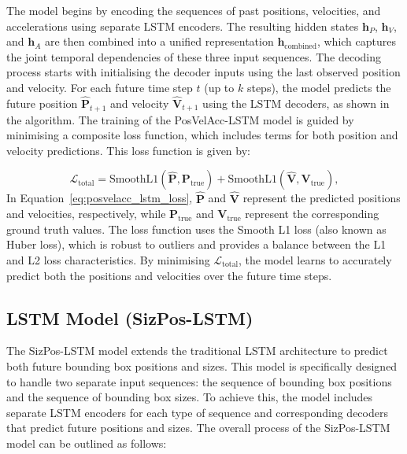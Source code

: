 \documentclass[12pt,oneside]{book} %
\begin{document}
\noindent The model begins by encoding the sequences of past positions, velocities, and accelerations using separate LSTM encoders. The resulting hidden states $\mathbf{h}_P$, $\mathbf{h}_V$, and $\mathbf{h}_A$ are then combined into a unified representation $\mathbf{h}_{\text{combined}}$, which captures the joint temporal dependencies of these three input sequences.
The decoding process starts with initialising the decoder inputs using the last observed position and velocity. For each future time step $t$ (up to $k$ steps), the model predicts the future position $\hat{\mathbf{P}}_{t+1}$ and velocity $\hat{\mathbf{V}}_{t+1}$ using the LSTM decoders, as shown in the algorithm.
The training of the PosVelAcc-LSTM model is guided by minimising a composite loss function, which includes terms for both position and velocity predictions. This loss function is given by:

\begin{equation}
    \mathcal{L}_{\text{total}} = \text{SmoothL1}(\hat{\mathbf{P}}, \mathbf{P}_{\text{true}}) + \text{SmoothL1}(\hat{\mathbf{V}}, \mathbf{V}_{\text{true}}), \label{eq:posvelacc_lstm_loss}
\end{equation}
\noindent In Equation~\eqref{eq:posvelacc_lstm_loss}, $\hat{\mathbf{P}}$ and $\hat{\mathbf{V}}$ represent the predicted positions and velocities, respectively, while $\mathbf{P}_{\text{true}}$ and $\mathbf{V}_{\text{true}}$ represent the corresponding ground truth values. The loss function uses the Smooth L1 loss (also known as Huber loss), which is robust to outliers and provides a balance between the L1 and L2 loss characteristics. By minimising $\mathcal{L}_{\text{total}}$, the model learns to accurately predict both the positions and velocities over the future time steps.

\newpage
\subsection*{LSTM Model (SizPos-LSTM)}
\noindent The SizPos-LSTM model extends the traditional LSTM architecture to predict both future bounding box positions and sizes. This model is specifically designed to handle two separate input sequences: the sequence of bounding box positions and the sequence of bounding box sizes. To achieve this, the model includes separate LSTM encoders for each type of sequence and corresponding decoders that predict future positions and sizes. The overall process of the SizPos-LSTM model can be outlined as follows:
\end{document}
